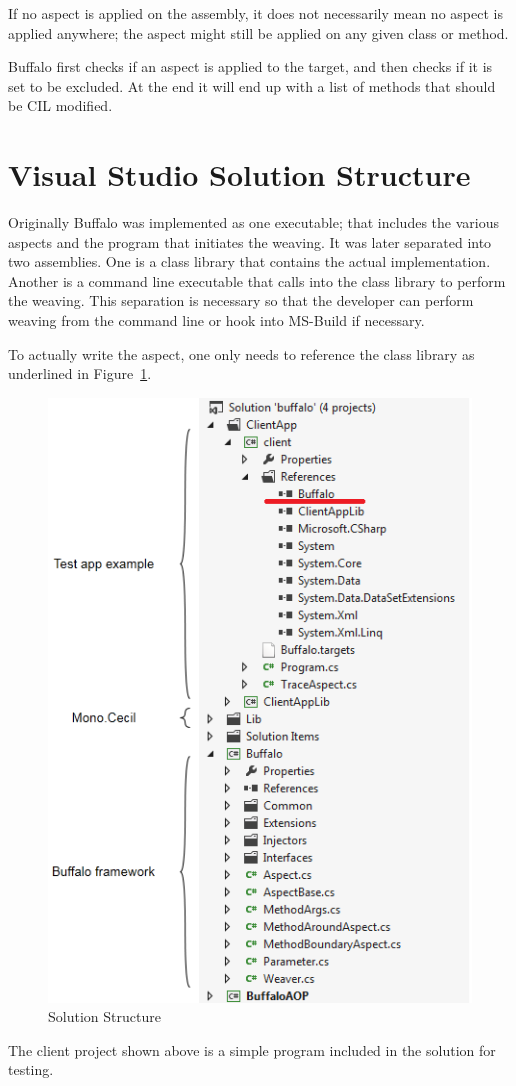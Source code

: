 If no aspect is applied on the assembly, it does not necessarily mean no aspect is applied anywhere; the aspect might still be applied on any given class or method.

Buffalo first checks if an aspect is applied to the target, and then checks if it is set to be excluded. At the end it will end up with a list of methods that should be CIL modified.


\section{Visual Studio Solution Structure}

Originally Buffalo was implemented as one executable; that includes the various aspects and the program that initiates the weaving. It was later separated into two assemblies. One is a class library that contains the actual implementation. Another is a command line executable that calls into the class library to perform the weaving. This separation is necessary so that the developer can perform weaving from the command line or hook into MS-Build if necessary. 

To actually write the aspect, one only needs to reference the class library as underlined in Figure~\ref{solutionexplorer}.

\begin{figure}[H]
  \includegraphics[scale=1.0]{SolutionExplorer3.PNG}
  \centering
  \caption{Solution Structure\label{solutionexplorer}}
\end{figure}

The client project shown above is a simple program included in the solution for testing.
